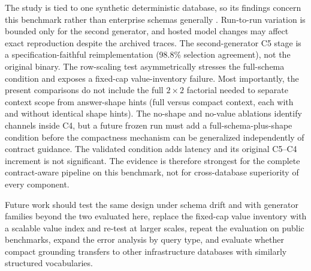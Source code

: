 \documentclass[cmc,article,submit,moreauthors,pdftex]{Definitions/tsp}
\begin{document}
The study is tied to one synthetic deterministic database, so its findings concern this benchmark rather than enterprise schemas generally \cite{zhong2020semantic,lei2024spider}. Run-to-run variation is bounded only for the second generator, and hosted model changes may affect exact reproduction despite the archived traces. The second-generator C5 stage is a specification-faithful reimplementation (98.8\% selection agreement), not the original binary. The row-scaling test asymmetrically stresses the full-schema condition and exposes a fixed-cap value-inventory failure. Most importantly, the present comparisons do not include the full $2\times2$ factorial needed to separate context scope from answer-shape hints (full versus compact context, each with and without identical shape hints). The no-shape and no-value ablations identify channels inside C4, but a future frozen run must add a full-schema-plus-shape condition before the compactness mechanism can be generalized independently of contract guidance. The validated condition adds latency and its original C5--C4 increment is not significant. The evidence is therefore strongest for the complete contract-aware pipeline on this benchmark, not for cross-database superiority of every component.

Future work should test the same design under schema drift and with generator families beyond the two evaluated here, replace the fixed-cap value inventory with a scalable value index and re-test at larger scales, repeat the evaluation on public benchmarks, expand the error analysis by query type, and evaluate whether compact grounding transfers to other infrastructure databases with similarly structured vocabularies.



\end{document}

